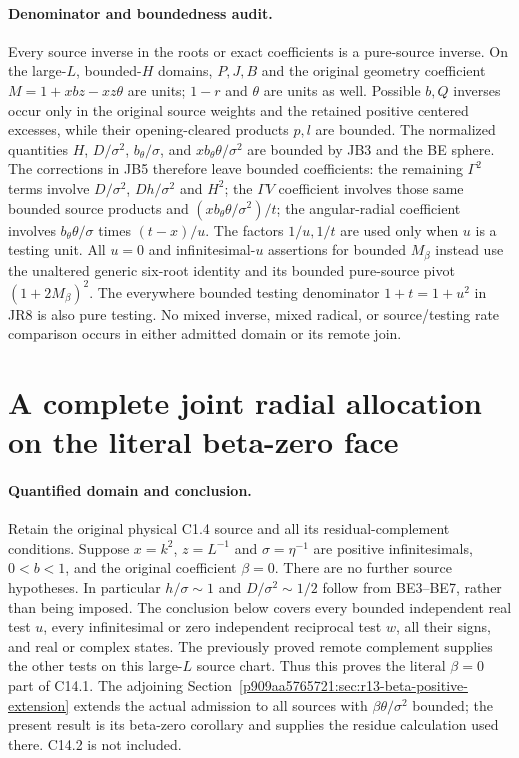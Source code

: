 \paragraph{Denominator and boundedness audit.}
Every source inverse in the roots or exact coefficients is a pure-source
inverse. On the large-$L$, bounded-$H$ domains, $P,J,B$ and the original
geometry coefficient $M=1+xbz-xz\theta$ are units; $1-r$ and $\theta$
are units as well. Possible $b,Q$ inverses occur only in the original
source weights and the retained positive centered excesses, while their
opening-cleared products $p,l$ are bounded. The normalized quantities
$H$, $D/\sigma^2$, $b_\theta/\sigma$, and
$xb_\theta\theta/\sigma^2$ are bounded by JB3 and the BE sphere.
The corrections in JB5 therefore leave bounded coefficients: the
remaining $\Gamma^2$ terms involve $D/\sigma^2$, $Dh/\sigma^2$ and
$H^2$; the $\Gamma V$ coefficient involves those same bounded source
products and $(xb_\theta\theta/\sigma^2)/t$; the angular-radial
coefficient involves $b_\theta\theta/\sigma$ times $(t-x)/u$.
The factors $1/u,1/t$ are used only when $u$ is a testing unit.
All $u=0$ and infinitesimal-$u$ assertions for bounded $M_\beta$
instead use the unaltered generic six-root identity and its bounded
pure-source pivot $(1+2M_\beta)^2$. The everywhere bounded testing
denominator $1+t=1+u^2$ in JR8 is also pure testing. No mixed inverse,
mixed radical, or source/testing rate comparison occurs in either
admitted domain or its remote join.


\section{\texorpdfstring{A complete joint radial allocation on the literal beta-zero face}{A complete joint radial allocation on the literal beta-zero face}}
\label{component:pb1104217f67b}

\label{pb1104217f67b:sec:r13-joint-radial-beta-zero}

\paragraph{Quantified domain and conclusion.}
Retain the original physical C1.4 source and all its residual-complement
conditions. Suppose $x=k^2$, $z=L^{-1}$ and $\sigma=\eta^{-1}$ are
positive infinitesimals, $0<b<1$, and the original coefficient $\beta=0$.
There are no further source hypotheses. In particular $h/\sigma\sim1$
and $D/\sigma^2\sim1/2$ follow from BE3--BE7, rather than being imposed.
The conclusion below covers every bounded independent real test $u$,
every infinitesimal or zero independent reciprocal test $w$, all their
signs, and real or complex states. The previously proved remote
complement supplies the other tests on this large-$L$ source chart.
Thus this proves the literal $\beta=0$ part of C14.1. The adjoining
Section~\ref{p909aa5765721:sec:r13-beta-positive-extension} extends the actual admission
to all sources with $\beta\theta/\sigma^2$ bounded; the present result
is its beta-zero corollary and supplies the residue calculation used
there. C14.2 is not included.

